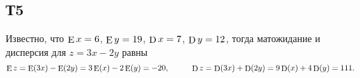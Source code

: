 \subsection*{Т5}

Известно, что $\mathop{\mathrm{E}}\nolimits x = 6$, $\mathop{\mathrm{E}}\nolimits y = 19$, $\mathop{\mathrm{D}}\nolimits x = 7$, $\mathop{\mathrm{D}}\nolimits y = 12$, тогда матожидание и дисперсия для $z = 3 x - 2 y$ равны
\begin{equation*}
    \E z = \E(3x) - \E(2y) = 3\E(x) - 2\E(y) = -20,
    \hspace{10 mm}  
    \D z = \D(3x) + \D(2y) = 9 \D(x) + 4\D(y) = 111.
\end{equation*}